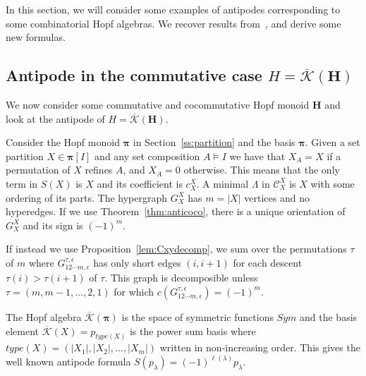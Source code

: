 \documentclass[ALCO,ThmDefs,Unicode,epreuves]{cedram}
\newcommand{\bH}{\mathbf{H}}
\newcommand{\bPi}{\bpi}
\newcommand{\bpi}{\boldsymbol \pi}
\newcommand{\Kc}{\mathcal{K}}
\newcommand{\Kcb}{\overline{\Kc}}
\begin{document}
In this section, we will consider some examples of antipodes corresponding to some combinatorial Hopf algebras. We recover results from~\cite{Aguiar-Ardila,BakerJarvisBergeronThiem,BenedettiHallamMachacek, Benedetti-Sagan, Humpert-Martin}, and derive some new formulas.


\subsection{Antipode in the commutative case \texorpdfstring{$H=\Kcb(\bH)$}{H=overline K(H)}}\label{ss:anticom} We now consider some commutative and cocommutative Hopf monoid $\bH$ and look at the antipode of $H=\Kcb(\bH)$.

\begin{exam} Consider the Hopf monoid $\bPi$ in Section~\ref{ss:partition} and the basis $\bpi$. Given a set partition $X\in{\bpi}[I]$
and any set composition $A\models I$ we have that $X_A=X$ if a permutation of $X$ refines $A$, and $X_A=0$ otherwise. This means that the only term in $S(X)$ is $X$
and its coefficient is $c_X^X$. A minimal $\Lambda$ in $\mathcal{C}_X^X$ is $X$ with some ordering of its parts. The hypergraph $G_X^X$ has $m=|X|$ vertices
and no hyperedges. If we use Theorem~\ref{thm:anticoco}, there is a unique orientation of $G_X^X$ and its sign is $(-1)^m$.

If instead we use Proposition~\ref{lem:Cxydecomp}, we sum over the permutations $\tau$ of $m$ where $G_{12\cdots m,\epsilon}^{\tau,\epsilon}$ has only short edges $(i,i+1)$
for each descent $\tau(i)>\tau(i+1)$ of $\tau$. This graph is decomposible unless $\tau=(m,m-1,\ldots,2,1)$ for which $c(G_{12\cdots m,\epsilon}^{\tau,\epsilon})=(-1)^m$. 

The Hopf algebra $\Kcb(\bPi)$ is the space of symmetric functions $Sym$ and the basis element $\Kcb(X)=p_{type(X)}$ is the power sum basis where $type(X)=(|X_1|,|X_2|,\ldots,|X_m|)$ written in non-increasing order. This gives the well known antipode formula $S(p_\lambda)=(-1)^{\ell(\lambda)}p_{\lambda}$.
\end{exam}
\end{document}
